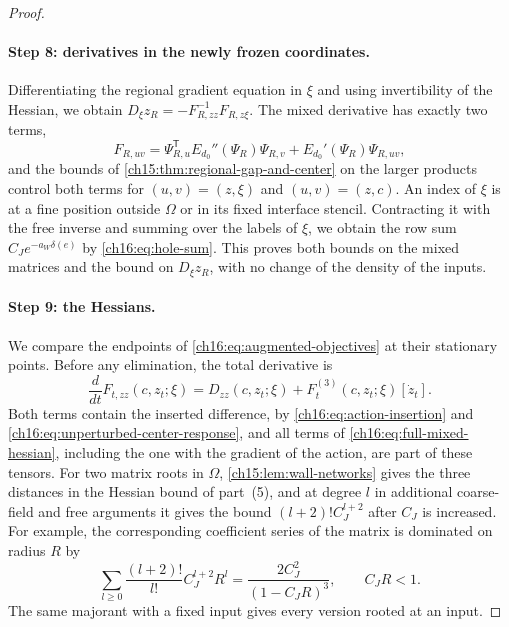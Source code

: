 \begin{proof}
\paragraph{Step 8: derivatives in the newly frozen coordinates.}
Differentiating the regional gradient equation in $\xi$ and using invertibility of the Hessian, we obtain $D_\xi z_R=-F_{R,zz}^{-1}F_{R,z\xi}$. The mixed derivative has exactly two terms,
\begin{equation}\label{ch16:eq:full-mixed-hessian}
 F_{R,uv}=\Psi_{R,u}^{\mathsf T}E_{d_0}''(\Psi_R)\Psi_{R,v}
                         +E_{d_0}'(\Psi_R)\Psi_{R,uv},
\end{equation}
and the bounds of \cref{ch15:thm:regional-gap-and-center} on the larger products control both terms for $(u,v)=(z,\xi)$ and $(u,v)=(z,c)$. An index of $\xi$ is at a fine position outside $\Omega$ or in its fixed interface stencil. Contracting it with the free inverse and summing over the labels of $\xi$, we obtain the row sum $C_Je^{-a_W\delta(e)}$ by \eqref{ch16:eq:hole-sum}. This proves both bounds on the mixed matrices and the bound on $D_\xi z_R$, with no change of the density of the inputs.

\paragraph{Step 9: the Hessians.}
We compare the endpoints of \eqref{ch16:eq:augmented-objectives} at their stationary points. Before any elimination, the total derivative is
\begin{equation}\label{ch16:eq:hessian-interpolation}
 \frac{d}{dt}F_{t,zz}(c,z_t;\xi)
        =D_{zz}(c,z_t;\xi)+F_t^{(3)}(c,z_t;\xi)[\dot z_t].
\end{equation}
Both terms contain the inserted difference, by \eqref{ch16:eq:action-insertion} and \eqref{ch16:eq:unperturbed-center-response}, and all terms of \eqref{ch16:eq:full-mixed-hessian}, including the one with the gradient of the action, are part of these tensors. For two matrix roots in $\Omega$, \cref{ch15:lem:wall-networks} gives the three distances in the Hessian bound of part~(5), and at degree $l$ in additional coarse-field and free arguments it gives the bound $(l+2)!C_J^{l+2}$ after $C_J$ is increased. For example, the corresponding coefficient series of the matrix is dominated on radius $R$ by
\[
 \sum_{l\ge0}\frac{(l+2)!}{l!}C_J^{l+2}R^l
                  =\frac{2C_J^2}{(1-C_JR)^3},\qquad C_JR<1.
\]
The same majorant with a fixed input gives every version rooted at an input.


\end{proof}
